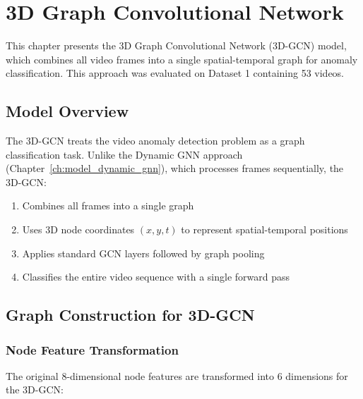 
\chapter{3D Graph Convolutional Network}
\label{ch:model_gcn3d}

This chapter presents the 3D Graph Convolutional Network (3D-GCN) model, which combines all video frames into a single spatial-temporal graph for anomaly classification. This approach was evaluated on Dataset 1 containing 53 videos.

\section{Model Overview}

The 3D-GCN treats the video anomaly detection problem as a graph classification task. Unlike the Dynamic GNN approach (Chapter~\ref{ch:model_dynamic_gnn}), which processes frames sequentially, the 3D-GCN:

\begin{enumerate}
    \item Combines all frames into a single graph
    \item Uses 3D node coordinates $(x, y, t)$ to represent spatial-temporal positions
    \item Applies standard GCN layers followed by graph pooling
    \item Classifies the entire video sequence with a single forward pass
\end{enumerate}

\section{Graph Construction for 3D-GCN}

\subsection{Node Feature Transformation}

The original 8-dimensional node features are transformed into 6 dimensions for the 3D-GCN:

